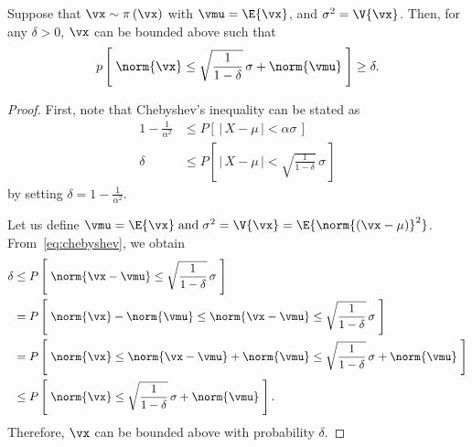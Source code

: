 
\begin{lemma}\label{thm:score_bound}
  Suppose that \(\vx \sim \pi\left(\vx\right)\) with \(\vmu = \E{ \vx }\), and \(\sigma^2 = \V{\vx}\).
  Then, for any \(\delta > 0\), \(\vx\) can be bounded above such that
  \[
  p\left[\; \norm{\vx} \leq \sqrt{\frac{1}{1 - \delta}} \, \sigma + \norm{\vmu} \;\right] \geq \delta.
  \]
\end{lemma}
\begin{proof}
  First, note that Chebyshev's inequality can be stated as
  \begin{align}
    1 - \frac{1}{\alpha^2} &\leq P\left[\, |\, X - \mu\,| < \alpha \sigma \,\right]  \\
    \delta &\leq P\left[\, |\, X - \mu\,| < \sqrt{\frac{1}{1 - \delta}} \, \sigma \,\right] \label{eq:chebyshev}
  \end{align}
  by setting \(\delta = 1 - \frac{1}{\alpha^2}\).

  Let us define
  \(
    \vmu     = \E{ \vx }\; \text{and} \;
    \sigma^2 = \V{ \vx } = \E{ \norm{ \left(\vx - \mu\right) }^{2}}
  \).
  From~\cref{eq:chebyshev}, we obtain
  \begin{align*}
    \delta
    &\leq P\left[\; \norm{ \vx - \vmu} \leq \sqrt{\frac{1}{1 - \delta}} \, \sigma \;\right] \\
    &= P\left[\; \norm{\vx} - \norm{\vmu} \leq \norm{ \vx - \vmu } \leq \sqrt{\frac{1}{1 - \delta}} \, \sigma \;\right] \\
    &= P\left[\; \norm{\vx} \leq \norm{\vx - \vmu} + \norm{\vmu} \leq \sqrt{\frac{1}{1 - \delta}} \, \sigma + \norm{\vmu} \;\right] \\
    &\leq P\left[\; \norm{\vx} \leq \sqrt{\frac{1}{1 - \delta}} \, \sigma + \norm{\vmu} \;\right].
  \end{align*}
  Therefore, \(\vx\) can be bounded above with probability \(\delta\).
\end{proof}
